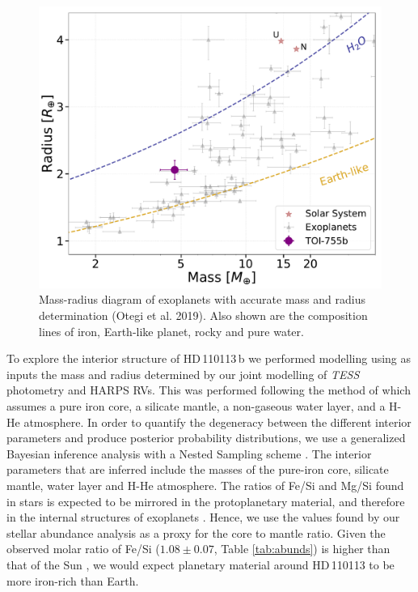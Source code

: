 \documentclass[fleqn,usenatbib]{mnras}
\newcommand{\tess}{{\it TESS}}
\newcommand{\harps}{{HARPS}}
\newcommand{\Tstar}{HD\,110113}
\newcommand{\Tplanet}{HD\,110113\,b}
\begin{document}
\begin{figure}
	\includegraphics[width=\columnwidth]{MR_755_Jon}
    \caption{Mass-radius diagram of exoplanets with accurate mass and radius determination (Otegi et al. 2019). Also shown are the composition lines of iron, Earth-like planet, rocky and pure water.}
    \label{fig:MR_Diagram}
\end{figure}

To explore the interior structure of \Tplanet{} we performed modelling using as inputs the mass and radius determined by our joint modelling of \tess{} photometry and \harps{} RVs.
This was performed following the method of \citet{otegi2020revisited} which assumes a pure iron core, a silicate mantle, a non-gaseous water layer, and a H-He atmosphere.
In order to quantify the degeneracy between the different interior parameters and produce posterior probability distributions, we use a generalized Bayesian inference analysis with a Nested Sampling scheme \citep[e.g.][]{2014A&A...564A.125B}.
The interior parameters that are inferred include the masses of the pure-iron core, silicate mantle, water layer and H-He atmosphere.
The ratios of Fe/Si and Mg/Si found in stars is expected to be mirrored in the protoplanetary material, and therefore in the internal structures of exoplanets \citep{thiabaud2015elemental}.
Hence, we use the values found by our stellar abundance analysis as a proxy for the core to mantle ratio.
Given the observed molar ratio of Fe/Si ($1.08\pm0.07$, Table \ref{tab:abunds}) is higher than that of the Sun  \citep[0.86,][]{thiabaud2015elemental}, we would expect planetary material around \Tstar{} to be more iron-rich than Earth.
\end{document}
